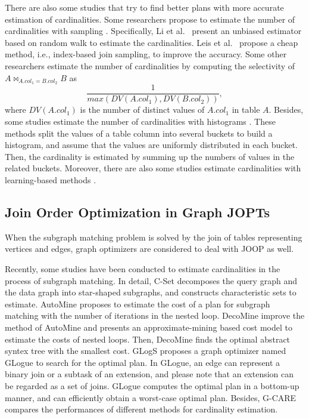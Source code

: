 \documentclass[sigconf, nonacm]{acmart}
\begin{document}
There are also some studies that try to find better plans with more accurate estimation of cardinalities.
Some researchers propose to estimate the number of cardinalities with sampling \cite{index-based-join-sampling,ripple-join,wanderjoin,index-based-join-sampling}.
Specifically, Li et al.~\cite{wanderjoin} present an unbiased estimator based on random walk to estimate the cardinalities.
Leis et al.~\cite{index-based-join-sampling} propose a cheap method, i.e., index-based join sampling, to improve the accuracy.
Some other researchers \cite{selinger,postgres-row-estimation} estimate the number of cardinalities by computing the selectivity of $A \bowtie_{A.col_1 = B.col_2} B$ as 
\begin{equation*}
    \frac{1}{max(DV(A.col_1), DV(B.col_2))},
\end{equation*}
where $DV(A.col_1)$ is the number of distinct values of $A.col_1$ in table $A$.
Besides, some studies estimate the number of cardinalities with histograms \cite{histogram,postgres-row-estimation}.
These methods split the values of a table column into several buckets to build a histogram, and assume that the values are uniformly distributed in each bucket.
Then, the cardinality is estimated by summing up the numbers of values in the related buckets.
Moreover, there are also some studies estimate cardinalities with learning-based methods \cite{learning-based-estimation-1,learning-based-estimation-2,learning-based-estimation-3,learning-based-estimation-4}.


\subsection{Join Order Optimization in Graph JOPTs}
\label{sec:related-work:gopt}
When the subgraph matching problem is solved by the join of tables representing vertices and edges, graph optimizers are considered to deal with JOOP as well.

Recently, some studies have been conducted to estimate cardinalities in the process of subgraph matching.
In detail, 
C-Set \cite{cset} decomposes the query graph and the data graph into star-shaped subgraphs, and constructs characteristic sets to estimate.
AutoMine \cite{AutoMine} proposes to estimate the cost of a plan for subgraph matching with the number of iterations in the nested loop.
DecoMine \cite{DecoMine} improve the method of AutoMine and presents an approximate-mining based cost model to estimate the costs of nested loops.
Then, DecoMine finds the optimal abstract syntex tree with the smallest cost.
GLogS \cite{GLogS} proposes a graph optimizer named GLogue to search for the optimal plan.
In GLogue, an edge can represent a binary join or a subtask of an extension, and please note that an extension can be regarded as a set of joins.
GLogue computes the optimal plan in a bottom-up manner, and can efficiently obtain a worst-case optimal plan.
Besides, G-CARE \cite{gcare} compares the performances of different methods for cardinality estimation.
\end{document}
